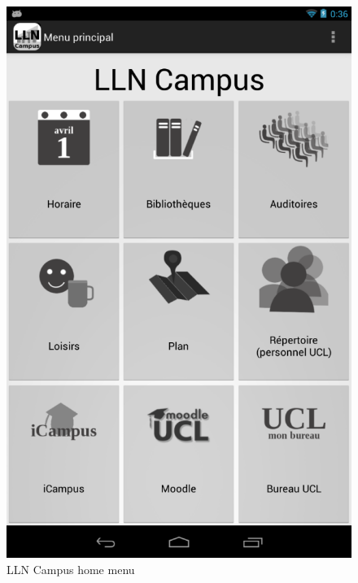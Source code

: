 \documentclass{eplmastersthesis}
\begin{document}
\begin{figure}
\centering
\includegraphics[scale = 0.2]{Images/llncampus.png}
\caption{LLN Campus home menu}
\end{figure}
\end{document}
